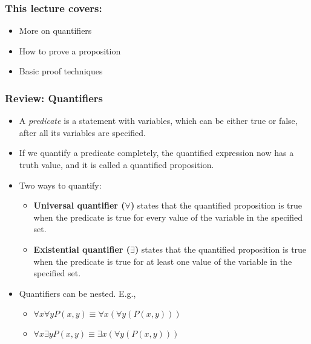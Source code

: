 \documentclass{beamer}
\begin{document}


\begin{frame}\frametitle{This lecture covers:}
  \begin{itemize}
  \item More on quantifiers
  \item How to prove a proposition
  \item Basic proof techniques
  \end{itemize}
\end{frame}

\begin{frame}\frametitle{Review: Quantifiers}
  \begin{itemize}
  \item A {\em predicate} is a statement with variables, which can be
    either true or false, after all its variables are specified.
  \item If we quantify a predicate completely, the quantified
    expression now has a truth value, and it is called a quantified
    proposition.
  \item Two ways to quantify:
    \begin{itemize}
    \item {\bf Universal quantifier ($\forall$)} states that the
      quantified proposition is true when the predicate is true for
      every value of the variable in the specified set.
    \item {\bf Existential quantifier ($\exists$)} states that the
      quantified proposition is true when the predicate is true for at
      least one value of the variable in the specified set.
    \end{itemize}

  \item Quantifiers can be nested.  E.g., 
    \begin{itemize}
    \item $\forall x\forall y P(x,y)\equiv \forall x(\forall y (P(x,y)))$
    \item $\forall x\exists y P(x,y)\equiv \exists x(\forall y (P(x,y)))$
    \end{itemize}
  \end{itemize}
\end{frame}
\end{document}
